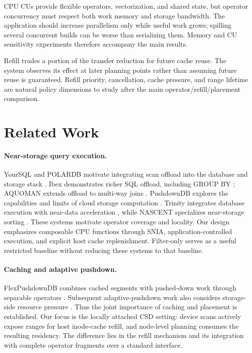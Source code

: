\documentclass[sigconf, nonacm]{acmart}
\begin{document}
CPU CUs provide flexible operators, vectorization, and shared state, but
operator concurrency must respect both work memory and storage bandwidth.
The application should increase parallelism only while useful work grows;
spilling several concurrent builds can be worse than serializing them.
Memory and CU sensitivity experiments therefore accompany the main results.

Refill trades a portion of the transfer reduction for future cache reuse.
The system observes its effect at later planning points rather than assuming
future reuse is guaranteed. Refill priority, cancellation, cache pressure,
and range lifetime are natural policy dimensions to study after the main
operator/refill/placement comparison.

\section{Related Work}
\paragraph{Near-storage query execution.}
YourSQL and POLARDB motivate integrating scan offload into the database and
storage stack \cite{yoursql,polardb}. Ibex demonstrates richer SQL offload,
including GROUP BY \cite{ibex}; AQUOMAN extends offload to multi-way joins
\cite{aquoman}. PushdownDB explores the capabilities and limits of cloud
storage computation \cite{pushdowndb}. Trinity integrates database execution
with near-data acceleration \cite{trinity}, while NASCENT specializes
near-storage sorting \cite{nascent}. These systems motivate operator coverage
and locality. Our design emphasizes composable CPU functions through SNIA,
application-controlled execution, and explicit host cache replenishment.
Filter-only serves as a useful restricted baseline without reducing these
systems to that baseline.

\paragraph{Caching and adaptive pushdown.}
FlexPushdownDB combines cached segments with pushed-down work through
separable operators \cite{fpdb}. Subsequent adaptive-pushdown work also
considers storage-side resource pressure \cite{adaptivepushdown}. Thus the
joint importance of caching and placement is established. Our focus is the
locally attached CSD setting: device scans actively expose ranges for host
inode-cache refill, and node-level planning consumes the resulting residency.
The difference lies in the refill mechanism and its integration with complete
operator fragments over a standard interface.
\end{document}
